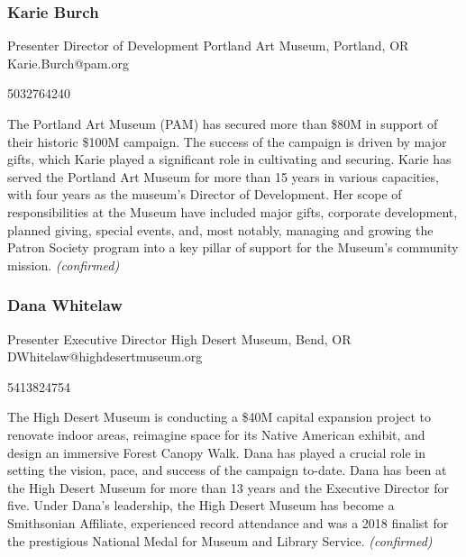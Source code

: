\documentclass{report}
\begin{document}
              
                \subsubsection*{ Karie Burch }
                Presenter\newline
                Director of Development\newline
                Portland Art Museum, Portland, OR
                \newline
                Karie.Burch@pam.org\newline
                
                5032764240\newline

                The Portland Art Museum (PAM) has secured more than \$80M in support of their historic \$100M campaign. The success of the campaign is driven by major gifts, which Karie played a significant role in cultivating and securing. Karie has served the Portland Art Museum for more than 15 years in various capacities, with four years as the museum’s Director of Development. Her scope of responsibilities at the Museum have included major gifts, corporate development, planned giving, special events, and, most notably, managing and growing the Patron Society program into a key pillar of support for the Museum’s community mission.
                \emph{ (confirmed) }
              

              
                \subsubsection*{ Dana Whitelaw }
                Presenter\newline
                Executive Director\newline
                High Desert Museum, Bend, OR
                \newline
                DWhitelaw@highdesertmuseum.org\newline
                
                5413824754\newline

                The High Desert Museum is conducting a \$40M capital expansion project to renovate indoor areas, reimagine space for its Native American exhibit, and design an immersive Forest Canopy Walk. Dana has played a crucial role in setting the vision, pace, and success of the campaign to-date. Dana has been at the High Desert Museum for more than 13 years and the Executive Director for five. Under Dana’s leadership, the High Desert Museum has become a Smithsonian Affiliate, experienced record attendance and was a 2018 finalist for the prestigious National Medal for Museum and Library Service.
                \emph{ (confirmed) }
              
\end{document}
